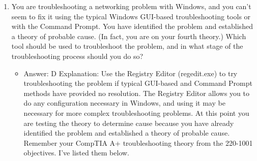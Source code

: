 \documentclass{article}
\begin{document}
\begin{enumerate}
\begin{itemize}
    \end{itemize}
    \item You are troubleshooting a networking problem with Windows, and
you can’t seem to fix it using the typical Windows GUI-based troubleshooting
tools or with the Command Prompt. You have identified
the problem and established a theory of probable cause. (In
fact, you are on your fourth theory.) Which tool should be used to
troubleshoot the problem, and in what stage of the troubleshooting
process should you do so?
    \begin{itemize}
        \item Answer: D
Explanation: Use the Registry Editor (regedit.exe) to try troubleshooting the problem
if typical GUI-based and Command Prompt methods have provided no resolution.
The Registry Editor allows you to do any configuration necessary in Windows, and
using it may be necessary for more complex troubleshooting problems. At this point
you are testing the theory to determine cause because you have already identified the
problem and established a theory of probable cause. Remember your CompTIA A+
troubleshooting theory from the 220-1001 objectives. I’ve listed them below.
    \end{itemize}
    
\end{enumerate}
\end{document}
